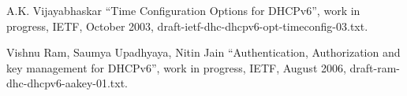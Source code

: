 \begin{thebibliography}{1}
 A.K. Vijayabhaskar ``Time Configuration Options
	for DHCPv6'', work in progress, IETF, October 2003,
	draft-ietf-dhc-dhcpv6-opt-timeconfig-03.txt.

 Vishnu Ram, Saumya Upadhyaya, Nitin Jain
	``Authentication, Authorization and key management for DHCPv6'',
	work in progress, IETF, August 2006,
	draft-ram-dhc-dhcpv6-aakey-01.txt.

\end{thebibliography}
